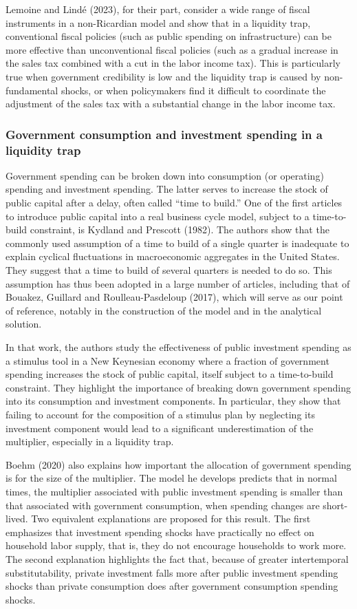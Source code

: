 \documentclass[12pt,letterpaper]{article}
\begin{document}
Lemoine and Lind\'e (2023), for their part, consider a wide range of fiscal instruments in a non-Ricardian model and show that in a liquidity trap, conventional fiscal policies (such as public spending on infrastructure) can be more effective than unconventional fiscal policies (such as a gradual increase in the sales tax combined with a cut in the labor income tax). This is particularly true when government credibility is low and the liquidity trap is caused by non-fundamental shocks, or when policymakers find it difficult to coordinate the adjustment of the sales tax with a substantial change in the labor income tax.

\subsubsection{Government consumption and investment spending in a liquidity trap}

Government spending can be broken down into consumption (or operating) spending and investment spending. The latter serves to increase the stock of public capital after a delay, often called ``time to build.'' One of the first articles to introduce public capital into a real business cycle model, subject to a time-to-build constraint, is Kydland and Prescott (1982). The authors show that the commonly used assumption of a time to build of a single quarter is inadequate to explain cyclical fluctuations in macroeconomic aggregates in the United States. They suggest that a time to build of several quarters is needed to do so. This assumption has thus been adopted in a large number of articles, including that of Bouakez, Guillard and Roulleau-Pasdeloup (2017), which will serve as our point of reference, notably in the construction of the model and in the analytical solution.

In that work, the authors study the effectiveness of public investment spending as a stimulus tool in a New Keynesian economy where a fraction of government spending increases the stock of public capital, itself subject to a time-to-build constraint. They highlight the importance of breaking down government spending into its consumption and investment components. In particular, they show that failing to account for the composition of a stimulus plan by neglecting its investment component would lead to a significant underestimation of the multiplier, especially in a liquidity trap.

Boehm (2020) also explains how important the allocation of government spending is for the size of the multiplier. The model he develops predicts that in normal times, the multiplier associated with public investment spending is smaller than that associated with government consumption, when spending changes are short-lived. Two equivalent explanations are proposed for this result. The first emphasizes that investment spending shocks have practically no effect on household labor supply, that is, they do not encourage households to work more. The second explanation highlights the fact that, because of greater intertemporal substitutability, private investment falls more after public investment spending shocks than private consumption does after government consumption spending shocks.
\end{document}
